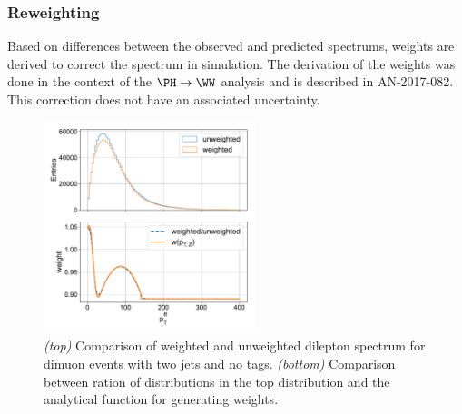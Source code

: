 \subsubsection{\PZ \pt Reweighting}
Based on differences between the observed and predicted \PZ \pt spectrums, weights are derived to correct the \pt spectrum in simulation. The derivation of the weights was done in the context of the $\PH \rightarrow \WW $ analysis and is described in AN-2017-082. This correction does not have an associated uncertainty.

\begin{figure}[ht]
    \centering
    \includegraphics[width=0.55\textwidth]{chapters/Analysis/sectionDataset/figures/z_pt_weighting}
    \caption{\emph{(top)} Comparison of weighted and unweighted dilepton \pt spectrum for dimuon events with two jets and no \PQb tags. \emph{(bottom)} Comparison between ration of distributions in the top distribution and the analytical function for generating weights.}
    \label{fig:analysis:dataset:z_weight}
\end{figure}




